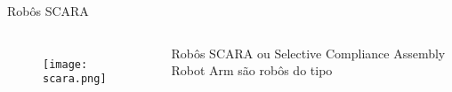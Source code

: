 \begin{frame}[t]{Robôs SCARA} 

    \begin{columns}

        \begin{figure}
            \texttt{[image: scara.png]}
        \end{figure}


        Robôs SCARA ou Selective Compliance Assembly Robot Arm são robôs do tipo
    \end{columns}

    



\end{frame}
